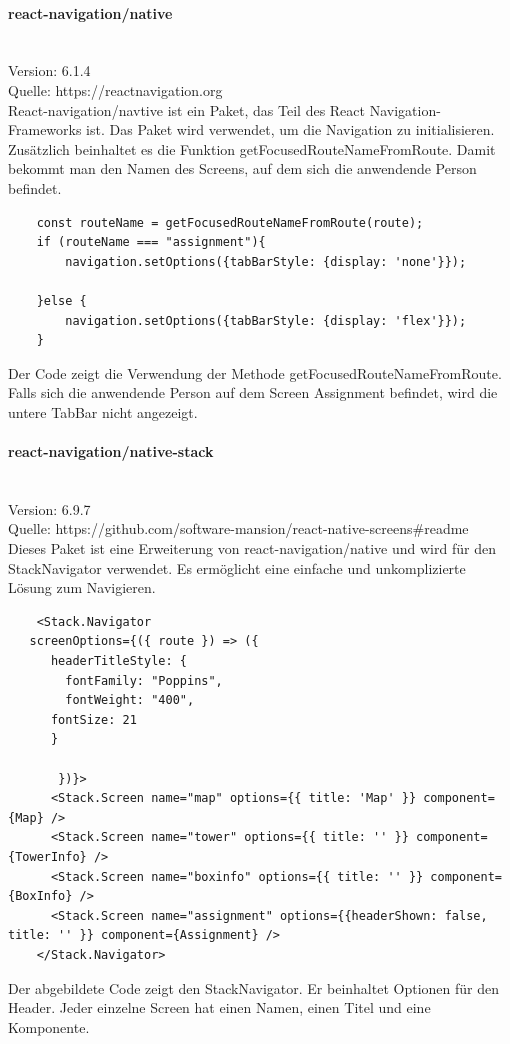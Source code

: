 \paragraph{react-navigation/native}\mbox{}\\
Version: 6.1.4\\
Quelle: https://reactnavigation.org\\
React-navigation/navtive ist ein Paket, das Teil des React Navigation-Frameworks ist. Das Paket wird verwendet, um die Navigation zu initialisieren. Zusätzlich beinhaltet es die Funktion getFocusedRouteNameFromRoute. Damit bekommt man den Namen des Screens, auf dem sich die anwendende Person befindet.\\
\begin{verbatim}
    const routeName = getFocusedRouteNameFromRoute(route);
    if (routeName === "assignment"){
        navigation.setOptions({tabBarStyle: {display: 'none'}});
        
    }else {
        navigation.setOptions({tabBarStyle: {display: 'flex'}});
    }
\end{verbatim}
Der Code zeigt die Verwendung der Methode getFocusedRouteNameFromRoute. Falls sich die anwendende Person auf dem Screen Assignment befindet, wird die untere TabBar nicht angezeigt.\\


\paragraph{react-navigation/native-stack}\mbox{}\\
Version: 6.9.7\\
Quelle: https://github.com/software-mansion/react-native-screens\#readme\\
Dieses Paket ist eine Erweiterung von react-navigation/native und wird für den StackNavigator verwendet. Es ermöglicht eine einfache und unkomplizierte Lösung zum Navigieren.
\begin{verbatim}
    <Stack.Navigator
   screenOptions={({ route }) => ({ 
      headerTitleStyle: {
        fontFamily: "Poppins",
        fontWeight: "400",
      fontSize: 21
      }  
      
       })}>
      <Stack.Screen name="map" options={{ title: 'Map' }} component={Map} />
      <Stack.Screen name="tower" options={{ title: '' }} component={TowerInfo} />
      <Stack.Screen name="boxinfo" options={{ title: '' }} component={BoxInfo} />
      <Stack.Screen name="assignment" options={{headerShown: false, title: '' }} component={Assignment} />
    </Stack.Navigator>
\end{verbatim}
Der abgebildete Code zeigt den StackNavigator. Er beinhaltet Optionen für den Header. Jeder einzelne Screen hat einen Namen, einen Titel und eine Komponente.\\


